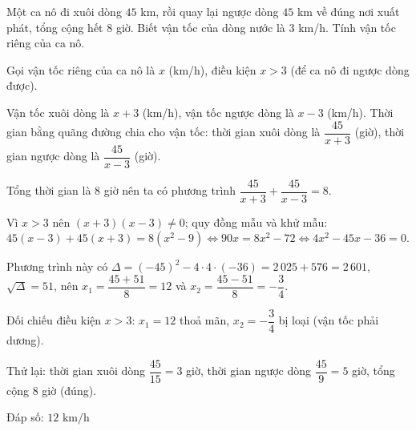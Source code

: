 \begin{problem}[9DS-PT2-041]
Một ca nô đi xuôi dòng $45$ km, rồi quay lại ngược dòng $45$ km về đúng nơi xuất phát, tổng cộng hết $8$ giờ. Biết vận tốc của dòng nước là $3$ km/h. Tính vận tốc riêng của ca nô.

\begin{solution}
Gọi vận tốc riêng của ca nô là $x$ (km/h), điều kiện $x > 3$ (để ca nô đi ngược dòng được).

Vận tốc xuôi dòng là $x + 3$ (km/h), vận tốc ngược dòng là $x - 3$ (km/h). Thời gian bằng quãng đường chia cho vận tốc: thời gian xuôi dòng là $\dfrac{45}{x + 3}$ (giờ), thời gian ngược dòng là $\dfrac{45}{x - 3}$ (giờ).

Tổng thời gian là $8$ giờ nên ta có phương trình $\dfrac{45}{x + 3} + \dfrac{45}{x - 3} = 8$.

Vì $x > 3$ nên $(x + 3)(x - 3) \neq 0$; quy đồng mẫu và khử mẫu: $45(x - 3) + 45(x + 3) = 8(x^2 - 9) \Leftrightarrow 90x = 8x^2 - 72 \Leftrightarrow 4x^2 - 45x - 36 = 0$.

Phương trình này có $\Delta = (-45)^2 - 4 \cdot 4 \cdot (-36) = 2\,025 + 576 = 2\,601$, $\sqrt{\Delta} = 51$, nên $x_1 = \dfrac{45 + 51}{8} = 12$ và $x_2 = \dfrac{45 - 51}{8} = -\dfrac{3}{4}$.

Đối chiếu điều kiện $x > 3$: $x_1 = 12$ thoả mãn, $x_2 = -\dfrac{3}{4}$ bị loại (vận tốc phải dương).

Thử lại: thời gian xuôi dòng $\dfrac{45}{15} = 3$ giờ, thời gian ngược dòng $\dfrac{45}{9} = 5$ giờ, tổng cộng $8$ giờ (đúng).

Đáp số: $\boxed{12 \text{ km/h}}$
\end{solution}
\end{problem}

